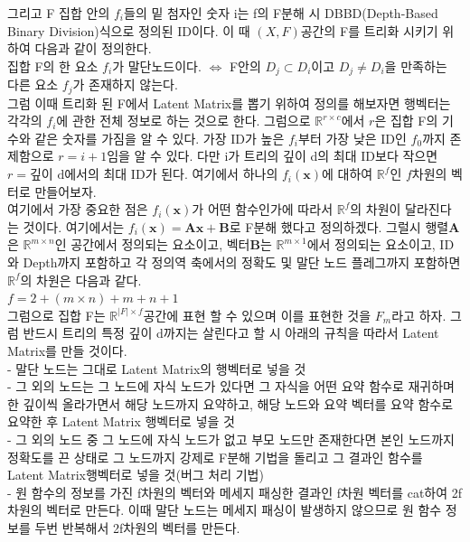 \documentclass{book}
\begin{document}
\begin{landscape}
그리고 F 집합 안의 $f_i$들의 밑 첨자인 숫자 i는 f의 F분해 시 DBBD(Depth-Based Binary Division)식으로 정의된 ID이다. 이 때 $(X,F)$공간의 F를 트리화 시키기 위하여 다음과 같이 정의한다.\\
집합 F의 한 요소 $f_i$가 말단노드이다. $\Longleftrightarrow$ F안의 $D_j \subset D_i$이고 $D_j \neq D_i$을 만족하는 다른 요소 $f_j$가 존재하지 않는다.\\

그럼 이때 트리화 된 F에서 Latent Matrix를 뽑기 위하여 정의를 해보자면 행벡터는 각각의 $f_i$에 관한 전체 정보로 하는 것으로 한다. 그럼으로 $\mathbb{R}^{r \times c}$에서 $r$은 집합 F의 기수와 같은 숫자를 가짐을 알 수 있다. 가장 ID가 높은 $f_i$부터 가장 낮은 ID인 $f_0$까지 존제함으로 $r= i + 1$임을 알 수 있다. 다만 i가 트리의 깊이 d의 최대 ID보다 작으면 $r = \text{깊이 d에서의 최대 ID}$가 된다. 여기에서 하나의 $f_i(\mathbf{x})$에 대하여 $\mathbb{R}^f$인 $f$차원의 벡터로 만들어보자.\\

 여기에서 가장 중요한 점은 $f_i(\mathbf{x})$가 어떤 함수인가에 따라서 $\mathbb{R}^f$의 차원이 달라진다는 것이다. 여기에서는 $f_i(\mathbf{x}) = \mathbf{A}\mathbf{x} + \mathbf{B}$로 F분해 했다고 정의하겠다. 그럴시 행렬$\mathbf{A}$은 $\mathbb{R}^{m \times n}$인 공간에서 정의되는 요소이고, 벡터$\mathbf{B}$는 $\mathbb{R}^{m \times 1}$에서 정의되는 요소이고, ID와 Depth까지 포함하고 각 정의역 축에서의 정확도 및 말단 노드 플레그까지 포함하면 $\mathbb{R}^f$의 차원은 다음과 같다.\\
 $f = 2 + (m \times n) + m + n + 1$\\
 
 그럼으로 집합 F는 $\mathbb{R}^{|F| \times f}$공간에 표현 할 수 있으며 이를 표현한 것을 $F_m$라고 하자. 그럼 반드시 트리의 특정 깊이 d까지는 살린다고 할 시 아래의 규칙을 따라서 Latent Matrix를 만들 것이다.\\
 - 말단 노드는 그대로 Latent Matrix의 행벡터로 넣을 것\\
 - 그 외의 노드는 그 노드에 자식 노드가 있다면 그 자식을 어떤 요약 함수로 재귀하며 한 깊이씩 올라가면서 해당 노드까지 요약하고, 해당 노드와 요약 벡터를 요약 함수로 요약한 후 Latent Matrix 행벡터로 넣을 것\\
 - 그 외의 노드 중 그 노드에 자식 노드가 없고 부모 노드만 존재한다면 본인 노드까지 정확도를 끈 상태로 그 노드까지 강제로 F분해 기법을 돌리고 그 결과인 함수를 Latent Matrix행벡터로 넣을 것(버그 처리 기법)\\
 - 원 함수의 정보를 가진 f차원의 벡터와 메세지 패싱한 결과인 f차원 벡터를 cat하여 2f차원의 벡터로 만든다. 이때 말단 노드는 메세지 패싱이 발생하지 않으므로 원 함수 정보를 두번 반복해서 2f차원의 벡터를 만든다.\\
 

\end{landscape}
\end{document}
